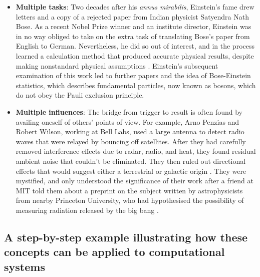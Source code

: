 
\begin{itemize}
\item \textbf{Multiple tasks}: Two decades after his \emph{annus
  mirabilis}, Einstein's fame drew letters and a copy of a rejected
  paper from Indian physicist Satyendra Nath Bose.  As a recent Nobel
  Prize winner and an institute director, Einstein was in no way
  obliged to take on the extra task of translating Bose's paper from
  English to German.  Nevertheless, he did so out of interest, and in
  the process learned a calculation method that produced accurate
  physical results, despite making nonstandard physical assumptions
  \cite{delbruck1980bose}.  Einstein's subsequent examination of this
  work led to further papers and the idea of Bose-Einstein statistics,
  which describes fundamental particles, now known as bosons, which do
  not obey the Pauli exclusion principle.
\end{itemize}

\begin{itemize}
\item \textbf{Multiple influences}: The bridge from trigger to result
  is often found by availing oneself of others' points of view.  For
  example, Arno Penzias and Robert Wilson, working at Bell Labs, used
  a large antenna to detect radio waves that were relayed by bouncing
  off satellites.  After they had carefully removed interference
  effects due to radar, radio, and heat, they found residual ambient
  noise that couldn't be eliminated.  They then ruled out directional
  effects that would suggest either a terrestrial or galactic origin
  \cite[p.~3]{lachieze1999cosmological}.  They were mystified, and
  only understood the significance of their work after a friend at MIT
  told them about a preprint on the subject written by astrophysicists
  from nearby Princeton University, who had hypothesised the
  possibility of measuring radiation released by the big bang
  \cite[p.~385]{shu1982physical}.
\end{itemize}

\subsection{A step-by-step example illustrating how these concepts can be applied to computational systems} \label{sec:by-example-summary}

